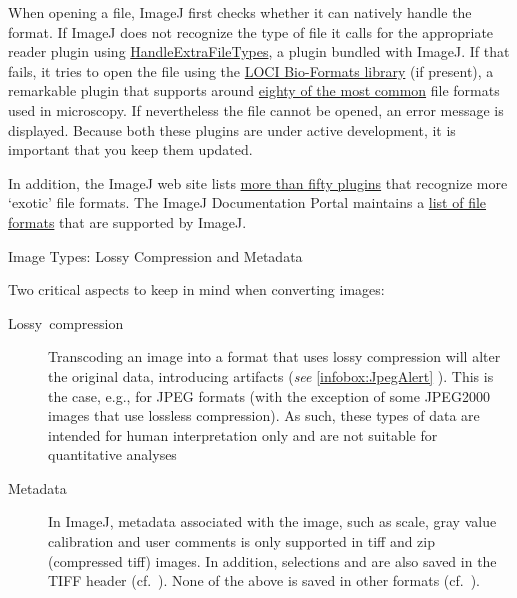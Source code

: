 When opening a file, ImageJ first checks whether it can natively handle
the format. If ImageJ does not recognize
the type of file it calls for the appropriate reader plugin using
\href{http://imagej.nih.gov/ij/plugins/file-handler.html}{HandleExtraFileTypes},
a plugin bundled with ImageJ. If that fails, it tries to open the
file using the \href{http://www.loci.wisc.edu/ome/formats.html}{LOCI Bio-Formats library}
(if present), a remarkable plugin that supports around \href{http://www.loci.wisc.edu/software/bio-formats}{eighty of the most common}
file formats used in microscopy. If nevertheless the file cannot be
opened, an error message is displayed. Because both these plugins
are under active development, it is important that you keep them updated.

In addition, the ImageJ web site lists \href{http://imagej.nih.gov/ij/plugins/\#io}{more than fifty plugins}
that recognize more `exotic' file formats. The ImageJ Documentation
Portal maintains a \href{http://imagejdocu.tudor.lu/doku.php?id=faq:general:which_file_formats_are_supported_by_imagej}{list of file formats}
that are supported by ImageJ.



\begin{infobox}
\caption{\label{infobox:Formats}Image Types: Lossy Compression and Metadata}


\noindent Two critical aspects to keep in mind when converting images:
\begin{description}
\item [{\label{misc:LossyCompression}Lossy\ compression}] Transcoding
an image into a format that uses lossy compression
will alter the original data, introducing artifacts (\emph{see} \ref{infobox:JpegAlert}
). This is the case, e.g., for JPEG formats
(with the exception of some JPEG2000
images that use lossless compression). As such, these types of data
are intended for human interpretation only and are not suitable for
quantitative analyses
\item [{\label{misc:Metadata}Metadata}] In ImageJ, metadata
associated with the image, such as scale, gray value calibration and
user comments is only supported in tiff and zip (compressed tiff)
images. In addition, selections and  are
also saved in the TIFF header (cf.\ \textsf{}).
None of the above is saved in other formats (cf.\ ).\end{description}
\end{infobox}



